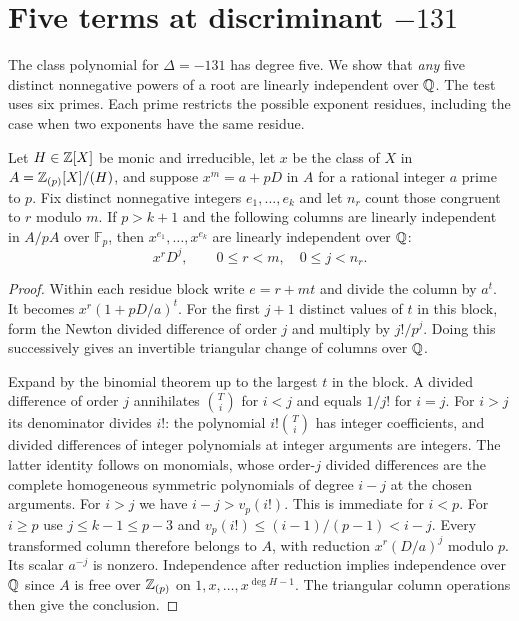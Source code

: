 \section{Five terms at discriminant \texorpdfstring{$-131$}{-131}}\label{sec:quintic-sieve}

The class polynomial for $\Delta=-131$ has degree five. We show that
\emph{any} five distinct nonnegative powers of a root are linearly
independent over $\mathbb Q$. The test uses six primes. Each prime restricts the
possible exponent residues, including the case when two exponents have the
same residue.

\begin{lemma}\label{lem:confluent}
Let $H\in\mathbb Z[X]$ be monic and irreducible, let $x$ be the class of $X$
in $A=\mathbb Z_{(p)}[X]/(H)$, and suppose $x^m=a+pD$ in $A$ for a
rational integer $a$ prime to $p$. Fix distinct nonnegative integers
$e_1,\ldots,e_k$ and let $n_r$ count those congruent to $r$ modulo $m$.
If $p>k+1$ and the following columns are linearly independent in
$A/pA$ over $\mathbb F_p$, then $x^{e_1},\ldots,x^{e_k}$ are linearly
independent over $\mathbb Q$:
\[
                x^r D^j,\qquad 0\le r<m,\quad 0\le j<n_r .
\]
\end{lemma}
\begin{proof}
Within each residue block write $e=r+mt$ and divide the column by $a^t$.
It becomes $x^r(1+pD/a)^t$. For the first $j+1$ distinct values of $t$
in this block, form the Newton divided difference of order $j$ and
multiply by $j!/p^j$. Doing this successively gives an invertible
triangular change of columns over $\mathbb Q$.

Expand by the binomial theorem up to the largest $t$ in the block.
A divided difference of order $j$ annihilates $\binom{T}{i}$ for $i<j$
and equals $1/j!$ for $i=j$. For $i>j$ its denominator divides $i!$:
the polynomial $i!\binom{T}{i}$ has integer coefficients, and divided
differences of integer polynomials at integer arguments are integers.
The latter identity follows on monomials, whose order-$j$ divided
differences are the complete homogeneous symmetric polynomials of
degree $i-j$ at the chosen arguments.
For $i>j$ we have $i-j>v_p(i!)$. This is immediate for $i<p$.
For $i\ge p$ use $j\le k-1\le p-3$ and
$v_p(i!)\le (i-1)/(p-1)<i-j$.
Every transformed column therefore belongs to $A$, with reduction
$x^r(D/a)^j$ modulo $p$. Its scalar $a^{-j}$ is nonzero. Independence
after reduction implies independence over $\mathbb Q$ since $A$ is free over
$\mathbb Z_{(p)}$ on $1,x,\ldots,x^{\deg H-1}$. The triangular column operations
then give the conclusion.
\end{proof}

